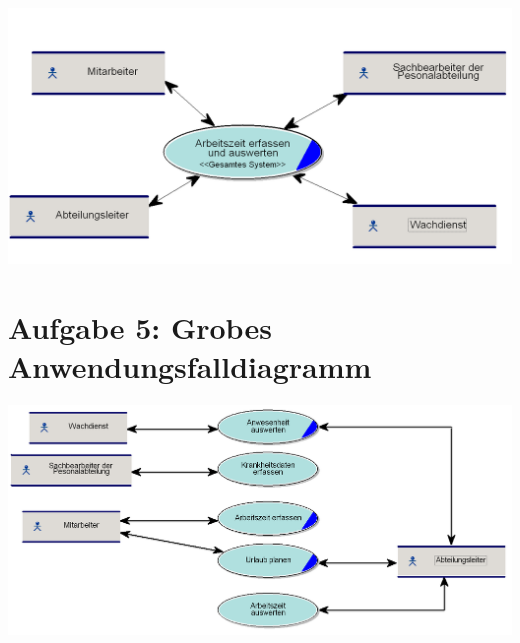 
\begin{center}
	\includegraphics[scale=0.4]{Kontextdiagramm.PNG}
\end{center}

\chapter*{Aufgabe 5: Grobes Anwendungsfalldiagramm}
\setcounter{section}{0}
\addtocounter{chapter}{1}

\begin{center}
	\includegraphics[scale=0.4]{GrobesAnwendungsfalldiagramm.PNG}
\end{center}


